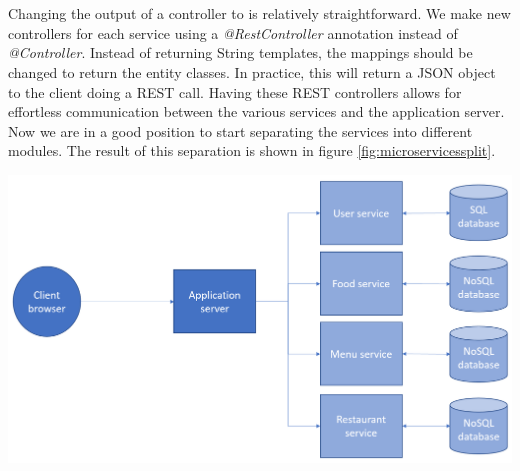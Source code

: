 \documentclass[12pt]{article}
\newenvironment{Figure}
	{\par\medskip\noindent\minipage{\linewidth}}
	{\endminipage\par\medskip}
\begin{document}
\begin{multicols}{2}
\\\\
Changing the output of a controller to is relatively straightforward. We make new controllers for each service using a \textit{@RestController} annotation instead of \textit{@Controller}. Instead of returning String templates, the mappings should be changed to return the entity classes. In practice, this will return a JSON object to the client doing a REST call. Having these REST controllers allows for effortless communication between the various services and the application server. Now we are in a good position to start separating the services into different modules. The result of this separation is shown in figure \ref{fig:microservicessplit}.
\begin{Figure}
	\centering
	\includegraphics[width=\linewidth]{illustrations/projectstructure2.png}
	\label{fig:microservicessplit}
\end{Figure}

\end{multicols}
\end{document}
